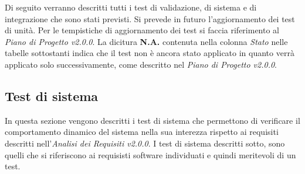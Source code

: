 Di seguito verranno descritti tutti i test di validazione, di sistema e di integrazione che sono stati previsti. Si prevede in futuro l'aggiornamento dei test di unità. Per le tempistiche di aggiornamento dei test si faccia riferimento al \textit{Piano di Progetto v2.0.0}. La dicitura \textbf{N.A.} contenuta nella colonna \textit{Stato} nelle tabelle sottostanti indica che il test non è ancora stato applicato in quanto verrà applicato solo successivamente, come descritto nel \textit{Piano di Progetto v2.0.0}.


\subsection{Test di sistema}
In questa sezione vengono descritti i test di sistema che permettono di verificare il comportamento dinamico del sistema nella sua interezza rispetto ai requisiti descritti nell'\textit{Analisi dei Requisiti v2.0.0}.
I test di sistema descritti sotto, sono quelli che si riferiscono ai requisisti software individuati e quindi meritevoli di un test.

